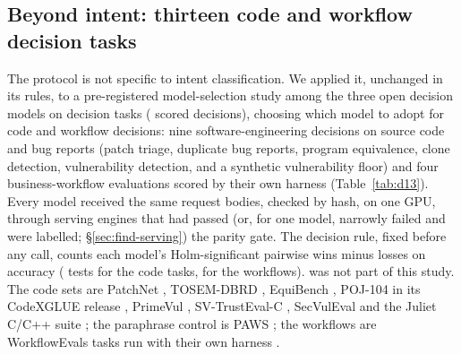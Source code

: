 \subsection{Beyond intent: thirteen code and workflow decision tasks}
\label{sec:res-13task}

The protocol is not specific to intent classification. We applied it, unchanged in its rules, to a pre-registered
model-selection study among the three open decision models on \dtTasks{} decision tasks (\dtTotalItems{} scored
decisions), choosing which model to adopt for code and workflow decisions: nine software-engineering decisions on
source code and bug reports (patch triage, duplicate bug reports, program equivalence, clone detection,
vulnerability detection, and a synthetic vulnerability floor) and four business-workflow evaluations scored by
their own harness (Table~\ref{tab:d13}). Every model received the same request bodies, checked
by hash, on one GPU, through serving engines that had passed (or, for one model, narrowly failed and were labelled;
\S\ref{sec:find-serving}) the parity gate. The decision rule, fixed before any call, counts each model's
Holm-significant pairwise wins minus losses on accuracy (\dtTestsE{} tests for the code tasks, \dtTestsC{} for the
workflows). \jev{} was not part of this study. The code sets are PatchNet \citep{hoang-etal-2021-patchnet},
TOSEM-DBRD \citep{zhang-etal-2023-dbrd}, EquiBench \citep{wei-etal-2025-equibench}, POJ-104 %
\citep{mou-etal-2016-tbcnn} in its CodeXGLUE release \citep{lu-etal-2021-codexglue}, PrimeVul
\citep{ding-etal-2025-primevul}, SV-TrustEval-C \citep{li-etal-2025-svtrusteval}, SecVulEval
\citep{ahmed-etal-2025-secvuleval} and the Juliet C/C++ suite \citep{nist-2017-juliet}; the paraphrase control is PAWS
\citep{zhang-etal-2019-paws}; the workflows are WorkflowEvals tasks run with their own harness
\citep{typesafe-2026-workflowevals,typesafe-2026-evalsafe-invoice}.

